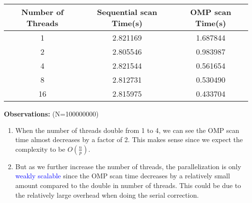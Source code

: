 \documentclass[11pt]{article}
\begin{document}
\begin{enumerate}
   \begin{tabular}{c|c|c}
           Number of Threads & Sequential scan Time(s)& OMP scan Time(s) \\ \hline
            
            1 & 2.821169 & 1.687844 \\ \hline
            2 & 2.805546 & 0.983987 \\ \hline
            4 & 2.821544 & 0.561654 \\ \hline
            8 & 2.812731 & 0.530490 \\ \hline
            16 & 2.815975 & 0.433704 \\ \hline
            
            \end{tabular}
            
    \textbf{Observations:} (N=100000000)
   \begin{enumerate}
       \item When the number of threads double from 1 to 4, we can see the OMP scan time almost decreases by a factor of 2. This makes sense since we expect the complexity to be $O(\frac{n}{p})$.
       \item But as we further increase the number of threads, the parallelization is only \textcolor{blue}{weakly scalable} since the OMP scan time decreases by a relatively small amount compared to the double in number of threads. This could be due to the relatively large overhead when doing the serial correction.
   \end{enumerate}
    
\end{enumerate}
\end{document}
